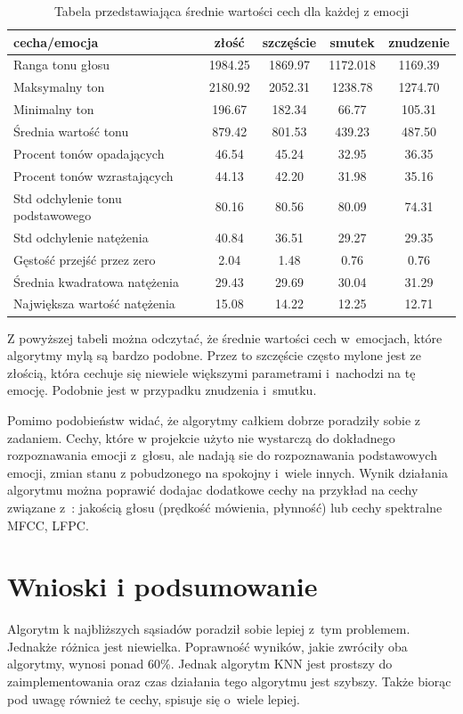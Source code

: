 \documentclass[declaration,shortabstract]{iithesis}
\begin{document}
\begin{table}[p]
\caption{Tabela przedstawiająca średnie wartości cech dla każdej z emocji}
  \begin{tabular}{|l|c|c|c|c|}
    \hline
    cecha/emocja & złość & szczęście & smutek & znudzenie \\ \hline
    Ranga tonu głosu & 1984.25 & 1869.97 & 1172.018 & 1169.39 \\ \hline
    Maksymalny ton & 2180.92 & 2052.31 & 1238.78 & 1274.70\\ \hline
    Minimalny ton & 196.67 & 182.34 & 66.77 & 105.31 \\ \hline
    Średnia wartość tonu & 879.42 & 801.53 & 439.23 & 487.50\\ \hline
	Procent tonów opadających & 46.54 & 45.24 & 32.95 & 36.35 \\ \hline
	Procent tonów wzrastających & 44.13 & 42.20 & 31.98 & 35.16 \\ \hline
	Std odchylenie tonu podstawowego & 80.16 & 80.56 & 80.09 & 74.31 \\ \hline
	Std odchylenie natężenia & 40.84 & 36.51 & 29.27 & 29.35 \\ \hline
	Gęstość przejść przez zero & 2.04 & 1.48 & 0.76 & 0.76 \\ \hline
	Średnia kwadratowa natężenia & 29.43 & 29.69 & 30.04 & 31.29 \\ \hline
	Największa wartość natężenia & 15.08 & 14.22 & 12.25 & 12.71 \\ \hline
  \end{tabular}
  \label{sr_war}
\end{table}

Z powyższej tabeli można odczytać, że średnie wartości cech w~emocjach, które algorytmy mylą są bardzo podobne. Przez to szczęście często mylone jest ze złością, która cechuje się niewiele większymi parametrami i~nachodzi na tę emocję. Podobnie jest w przypadku znudzenia i~smutku. 

Pomimo podobieństw widać, że algorytmy całkiem dobrze poradziły sobie z zadaniem. Cechy, które w projekcie użyto nie wystarczą do dokładnego rozpoznawania emocji z~głosu, ale nadają sie do rozpoznawania podstawowych emocji, zmian stanu z pobudzonego na spokojny i~wiele innych. Wynik działania algorytmu można poprawić dodajac dodatkowe cechy na przykład na cechy związane z~: jakością głosu (prędkość mówienia, płynność) lub cechy spektralne MFCC, LFPC. 

\chapter{Wnioski i podsumowanie}
Algorytm k najbliższych sąsiadów poradził sobie lepiej z~tym problemem. Jednakże różnica jest niewielka. Poprawność wyników, jakie zwróciły oba algorytmy, wynosi ponad 60\%. Jednak algorytm KNN jest prostszy do zaimplementowania oraz czas działania tego algorytmu jest szybszy. Także biorąc pod uwagę również te cechy, spisuje się o~wiele lepiej.
\end{document}
